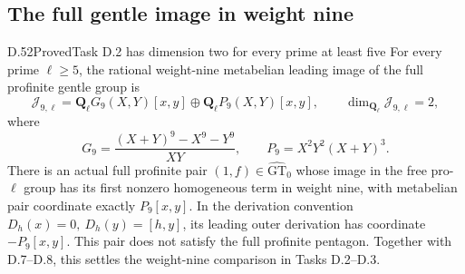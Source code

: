 \subsection{The full gentle image in weight nine}

\begin{statement}{D.52}{Proved}{Task D.2 has dimension two for every prime at least five}
For every prime \(\ell\geq5\), the rational weight-nine metabelian
leading image of the full profinite gentle group is
\[
 \mathscr J_{9,\ell}
   =\mathbf Q_\ell G_9(X,Y)[x,y]
       \oplus\mathbf Q_\ell P_9(X,Y)[x,y],\qquad
 \dim_{\mathbf Q_\ell}\mathscr J_{9,\ell}=2,
 \tag{D.52.1}
\]
where
\[
 G_9=\frac{(X+Y)^9-X^9-Y^9}{XY},\qquad
 P_9=X^2Y^2(X+Y)^3.
 \tag{D.52.2}
\]
There is an actual full profinite pair
\((1,f)\in\widehat{\mathrm{GT}}_0\) whose image in the
free pro-\(\ell\) group has its first nonzero homogeneous term in
weight nine, with metabelian pair coordinate exactly
\(P_9[x,y]\). In the derivation convention
\(D_h(x)=0,\ D_h(y)=[h,y]\), its leading outer derivation has
coordinate \(-P_9[x,y]\). This pair does not satisfy the full
profinite pentagon. Together with D.7--D.8, this settles the
weight-nine comparison in Tasks D.2--D.3.
\end{statement}

